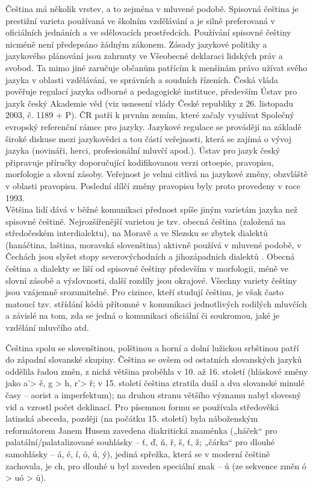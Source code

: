 \begin{multicols}{2}
Čeština má několik vrstev, a to zejména v mluvené podobě. Spisovná čeština je prestižní varieta používaná ve školním vzdělávání a je silně preferovaná v oficiálních jednáních a ve sdělovacích prostředcích. Používání spisovné češtiny nicméně není předepsáno žádným zákonem. Zásady jazykové politiky a jazykového plánování jsou zahrnuty ve Všeobecné deklaraci lidských práv a svobod. Ta mimo jiné zaručuje občanům patřícím k menšinám právo užívat svého jazyka v oblasti vzdělávání, ve správních a soudních řízeních. Česká vláda pověřuje regulací jazyka odborné a pedagogické instituce, především Ústav pro jazyk český Akademie věd (viz usnesení vlády České republiky z 26. listopadu 2003, č. 1189 + P). ČR patří k prvním zemím, které začaly využívat Společný evropský referenční rámec pro jazyky. Jazykové regulace se provádějí na základě široké diskuse mezi jazykovědci a tou částí veřejnosti, která se zajímá o vývoj jazyka (novináři, herci, profesionální mluvčí apod.). Ústav pro jazyk český připravuje příručky doporučující kodifikovanou verzi ortoepie, pravopisu, morfologie a slovní zásoby. Veřejnost je velmi citlivá na jazykové změny, obzvláště v oblasti pravopisu. Poslední dílčí změny pravopisu byly proto provedeny v roce 1993.\\
Většina lidí dává v běžné komunikaci přednost spíše jiným varietám jazyka než spisovné češtině. Nejrozšířenější varietou je tzv. obecná čeština (založená na středočeském interdialektu), na Moravě a ve Slezsku se zbytek dialektů (hanáčtina, laština, moravská slovenština) aktivně používá v mluvené podobě, v Čechách jsou slyšet stopy severovýchodních a jihozápadních dialektů \cite{Note3}. Obecná čeština a dialekty se liší od spisovné češtiny především v morfologii, méně ve slovní zásobě a výslovnosti, další rozdíly jsou okrajové. Všechny variety češtiny jsou vzájemně srozumitelné. Pro cizince, kteří studují češtinu, je však často matoucí tzv. střídání kódů přítomné v komunikaci jednotlivých rodilých mluvčích a závislé na tom, zda se jedná o komunikaci oficiální či soukromou, jaké je vzdělání mluvčího atd.

Čeština spolu se slovenštinou, polštinou a horní a dolní lužickou srbštinou patří do západní slovanské skupiny. Čeština se ovšem od ostatních slovanských jazyků oddělila řadou změn, z nichž většina proběhla v 10. až 16. století (hláskové změny jako a’> ě, g > h, r’> ř; v 15. století čeština ztratila duál a dva slovanské minulé časy – aorist a imperfektum); na druhou stranu většího významu nabyl slovesný vid a vzrostl počet deklinací. Pro písemnou formu se používala středověká latinská abeceda, později (na počátku 15. století) byla náboženským reformátorem Janem Husem zavedena diakritická znaménka („háček“ pro palatální/palatalizované souhlásky – ť, ď, ň, ř, š, ť, ž; „čárka“ pro dlouhé samohlásky – á, é, í, ó, ú, ý), jediná spřežka, která se v moderní češtině zachovala, je ch, pro dlouhé u byl zaveden speciální znak – ů (ze sekvence změn ó > uó > ů).


\end{multicols}
